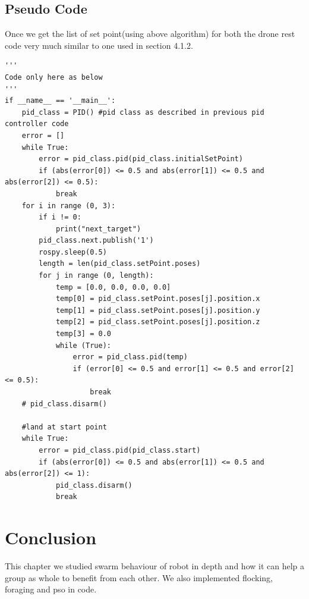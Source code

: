 \subsection{Pseudo Code}
Once we get the list of set point(using above algorithm) for both the drone rest code very much similar to one used in section 4.1.2.
\begin{verbatim}
'''
Code only here as below
'''
if __name__ == '__main__':
    pid_class = PID() #pid class as described in previous pid controller code
    error = []
    while True:
        error = pid_class.pid(pid_class.initialSetPoint)
        if (abs(error[0]) <= 0.5 and abs(error[1]) <= 0.5 and abs(error[2]) <= 0.5):
            break
    for i in range (0, 3):
        if i != 0:
            print("next_target")
        pid_class.next.publish('1')
        rospy.sleep(0.5)
        length = len(pid_class.setPoint.poses)
        for j in range (0, length):
            temp = [0.0, 0.0, 0.0, 0.0]
            temp[0] = pid_class.setPoint.poses[j].position.x
            temp[1] = pid_class.setPoint.poses[j].position.y
            temp[2] = pid_class.setPoint.poses[j].position.z
            temp[3] = 0.0
            while (True):
                error = pid_class.pid(temp)
                if (error[0] <= 0.5 and error[1] <= 0.5 and error[2] <= 0.5):
                    break
    # pid_class.disarm()

    #land at start point
    while True:
        error = pid_class.pid(pid_class.start)
        if (abs(error[0]) <= 0.5 and abs(error[1]) <= 0.5 and abs(error[2]) <= 1):
            pid_class.disarm()
            break
\end{verbatim}


\section{Conclusion}
This chapter we studied swarm behaviour of robot in depth and how it can help a group as whole to benefit from each other. We also implemented flocking, foraging and pso in code.
